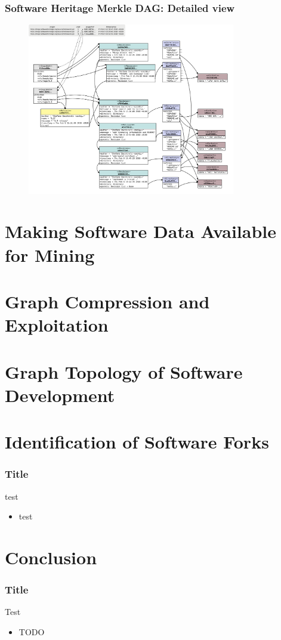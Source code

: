 \documentclass[aspectratio=169,xcolor=table]{beamer}
\begin{document}
    \begin{frame}
        \frametitle{Software Heritage Merkle DAG: Detailed view}
        \begin{figure}
            \centering
            \includegraphics[height=7.5cm]{../img/swh-merkle-dag}
        \end{figure}
    \end{frame}


    \section{Making Software Data Available for Mining}

    \section{Graph Compression and Exploitation}

    \section{Graph Topology of Software Development}

    \section{Identification of Software Forks}

    \begin{frame}
        \frametitle{Title}

        \begin{block}{test}
            \begin{itemize}
                \item test
            \end{itemize}
        \end{block}
    \end{frame}

    \section{Conclusion}

    \begin{frame}
        \frametitle{Title}

        \begin{block}{Test}
            \begin{itemize}
                \item TODO
            \end{itemize}
        \end{block}
    \end{frame}
\end{document}
